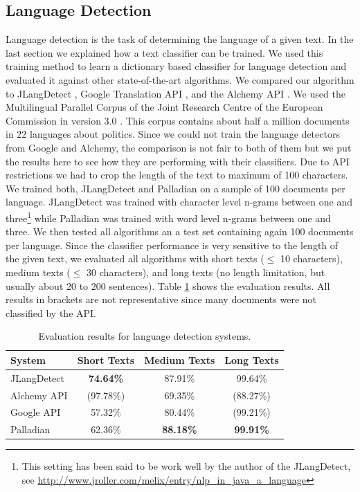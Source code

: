 \subsection{Language Detection}
Language detection is the task of determining the language of a given text. In the last section we explained how a text classifier can be trained. We used this training method to learn a dictionary based classifier for language detection and evaluated it against other state-of-the-art algorithms.
We compared our algorithm to JLangDetect \cite{jlangdetect}, Google Translation API \cite{googleTranslationAPI}, and the Alchemy API \cite{alchemyLanguageAPI}. We used the Multilingual Parallel Corpus of the Joint Research Centre of the European Commission in version 3.0 \cite{jrcCorpus}. This corpus contains about half a million documents in 22 languages about politics. Since we could not train the language detectors from Google and Alchemy, the comparison is not fair to both of them but we put the results here to see how they are performing with their classifiers. Due to API restrictions we had to crop the length of the text to maximum of 100 characters.
We trained both, JLangDetect and Palladian on a sample of 100 documents per language. JLangDetect was trained with character level n-grams between one and three\footnote{This setting has been said to be work well by the author of the JLangDetect, see \url{http://www.jroller.com/melix/entry/nlp_in_java_a_language}} while Palladian was trained with word level n-grams between one and three. We then tested all algorithms an a test set containing again 100 documents per language. Since the classifier performance is very sensitive to the length of the given text, we evaluated all algorithms with short texts ($\leq$ 10 characters), medium texts ($\leq$ 30 characters), and long texts (no length limitation, but usually about 20 to 200 sentences).
Table \ref{tab:languageDetectionEvaluation} shows the evaluation results. All results in brackets are not representative since many documents were not classified by the API.

\begin{table}[ht]
\centering
\begin{tabular}{|l|c|c|c|}
	\hline
	System & Short Texts & Medium Texts & Long Texts \\ 
	\hline
	JLangDetect & \textbf{74.64\%} & 87.91\% & 99.64\% \\ 
	\hline
	Alchemy API & (97.78\%) & 69.35\% & (88.27\%) \\ 
	\hline
	Google API & 57.32\% & 80.44\% & (99.21\%) \\ 
	\hline
	Palladian & 62.36\% & \textbf{88.18\%} & \textbf{99.91\%}  \\ 
	\hline
\end{tabular}
\caption{Evaluation results for language detection systems.}
\label{tab:languageDetectionEvaluation}
\end{table}

